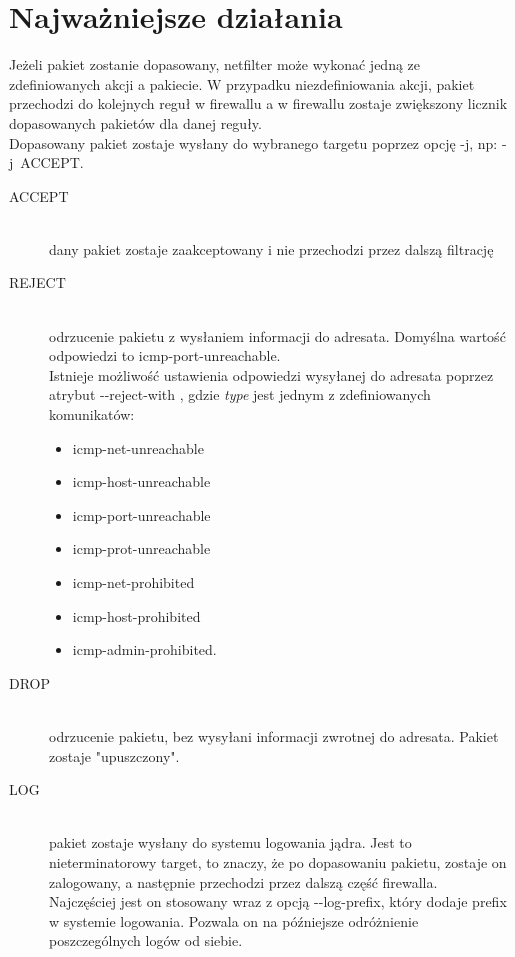 	\section{Najważniejsze działania}
		Jeżeli pakiet zostanie dopasowany, netfilter może wykonać jedną ze zdefiniowanych akcji a pakiecie. W przypadku niezdefiniowania akcji, pakiet przechodzi do kolejnych reguł w firewallu a w firewallu zostaje zwiększony licznik dopasowanych pakietów dla danej reguły.\\
		Dopasowany pakiet zostaje wysłany do wybranego targetu poprzez opcję -j, np: -j~ACCEPT.
		\begin{description}
			\item[ACCEPT] \hfill \\
				dany pakiet zostaje zaakceptowany i nie przechodzi przez dalszą filtrację
			\item[REJECT] \hfill \\
				odrzucenie pakietu z wysłaniem informacji do adresata. Domyślna wartość odpowiedzi to icmp-port-unreachable.\\
				Istnieje możliwość ustawienia odpowiedzi wysyłanej do adresata poprzez atrybut -{}-reject-with ,
				gdzie \textit{type} jest jednym z zdefiniowanych komunikatów:
				\begin{itemize}
					\item icmp-net-unreachable
					\item icmp-host-unreachable
					\item icmp-port-unreachable
					\item icmp-prot-unreachable
					\item icmp-net-prohibited
					\item icmp-host-prohibited
					\item icmp-admin-prohibited.
				\end{itemize}
			\item[DROP] \hfill \\
				odrzucenie pakietu, bez wysyłani informacji zwrotnej do adresata. Pakiet zostaje "upuszczony".
			\item[LOG] \hfill \\
				pakiet zostaje wysłany do systemu logowania jądra. Jest to nieterminatorowy target, to znaczy, że po dopasowaniu pakietu, zostaje on zalogowany, a następnie przechodzi przez dalszą część firewalla.\\
				Najczęściej jest on stosowany wraz z opcją -{}-log-prefix, który dodaje prefix w systemie logowania. Pozwala on na późniejsze odróżnienie poszczególnych logów od siebie.

\end{description}
